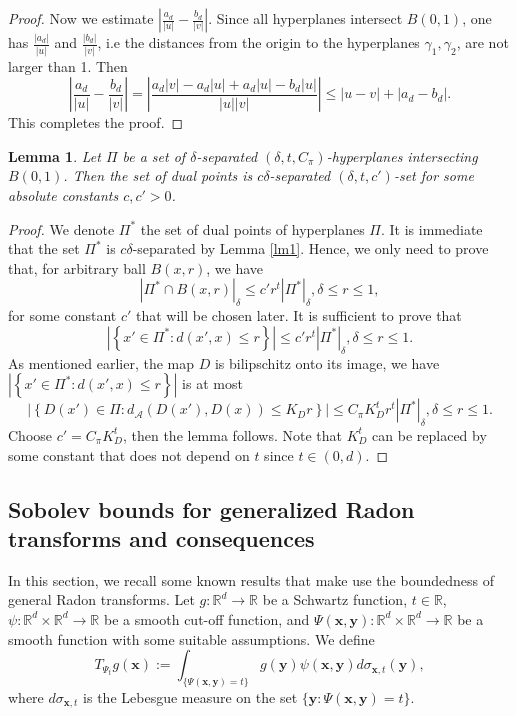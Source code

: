 \documentclass[11pt]{article}
\newtheorem{lemma}[theorem]{Lemma}
\newcommand{\1}{\mathbf{1}}
\begin{document}
\begin{proof}
Now we estimate $\left|\frac{a_d}{|u|}-\frac{b_d}{|v|}\right|$. Since all hyperplanes intersect $B(0, 1)$, one has $\frac{|a_d|}{|u|}$ and $\frac{|b_d|}{|v|}$, i.e the distances from the origin to the hyperplanes $\gamma_1,\gamma_2$, are not larger than 1. Then
\[\left|\dfrac{a_d}{|u|}-\dfrac{b_d}{|v|}\right| = \left|\dfrac{a_d|v|-a_d|u|+a_d|u|-b_d|u|}{|u||v|}\right| \le |u-v| +|a_d-b_d|.\]
This completes the proof.
\end{proof}
\begin{lemma}\label{lm2}
    Let $\Pi$ be a set of $\delta$-separated $(\delta, t, C_{\pi})$-hyperplanes intersecting $B(0, 1)$. Then the set of dual points is $c\delta$-separated $(\delta, t, c')$-set for some absolute constants $c, c'>0$.
\end{lemma}
\begin{proof}
     We denote $\Pi^*$ the set of dual points of hyperplanes $\Pi$. It is immediate that the set $\Pi^*$ is $c\delta$-separated by Lemma \ref{lm1}. Hence, we only need to prove that, for arbitrary ball $B(x,r)$, we have
    \[|\Pi^*\cap B(x, r)|_\delta \le c' r^t|\Pi^*|_\delta, \delta\le r\le 1,\]
    for some constant $c'$ that will be chosen later.  It is sufficient to prove that 
    \[|\left\lbrace  x' \in \Pi^*: d(x',x) \le r\right\rbrace| \le c'r^t|\Pi^*|_{\delta}, \delta\le r\le 1.\]
As mentioned earlier, the map $D$ is bilipschitz onto its image, we have $|\left\lbrace  x' \in \Pi^*: d(x',x) \le r\right\rbrace|$ is at most
    \[\left|\left\lbrace  D(x')\in \Pi : d_\mathcal{A}(D(x'),D(x)) \le K_Dr\right\rbrace\right| \le C_\pi K_D^t r^t|\Pi^*|_\delta, \delta\le r\le 1.\]
    Choose $c'=C_\pi K_D^{t}$, then the lemma follows. Note that $K_D^t$ can be replaced by some constant that does not depend on $t$ since $t\in (0, d)$. 
    \end{proof}
\subsection{Sobolev bounds for generalized Radon transforms and consequences}

In this section, we recall some known results that make use the boundedness of general Radon transforms. Let $g\colon \mathbb{R}^d\to \mathbb{R}$ be a Schwartz function, $t\in \mathbb{R}$, $\psi\colon \mathbb R^d \times \mathbb R^d \rightarrow \mathbb R$ be a smooth cut-off function, and   $ \Psi(\mathbf{x}, \mathbf{y}) : \mathbb R^d \times \mathbb R^d \rightarrow \mathbb R$ be a  smooth function with some suitable assumptions. We define
\[T_{\Psi_t}g(\mathbf{x}):=\int_{\{\Psi(\mathbf{x}, \mathbf{y})=t\}}g(\mathbf{y})\psi(\mathbf{x}, \mathbf{y})d\sigma_{\mathbf{x}, t}(\mathbf{y}),\]
where $d\sigma_{\mathbf{x}, t}$ is the Lebesgue measure on the set $\{\mathbf{y}\colon \Psi(\mathbf{x}, \mathbf{y})=t\}.$
\end{document}
